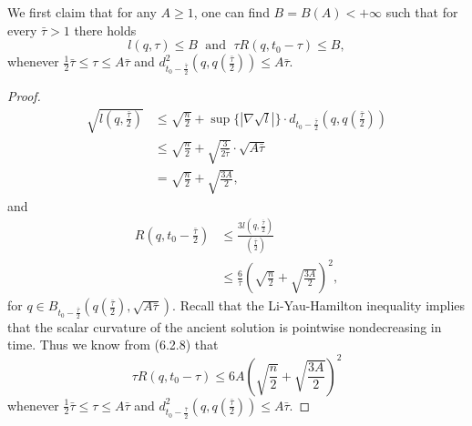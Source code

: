 \begin{lemma}
  \label{lem:cz-reduced-distance-curvature-parabolic-annulus}
We first claim that for any $A \geq 1$, one can find
$B=B(A)<+\infty$ such that for every $\bar{\tau}>1$ there holds
\begin{equation} l(q,\tau)\leq B \; \mbox{ and }\;  \tau R(q,t_0-\tau)\leq B,
\end{equation} whenever $\frac{1}{2}\bar{\tau}\leq \tau \leq A\bar{\tau}$ and
$d_{t_0-\frac{\bar{\tau}}{2}}^2 (q,q(\frac{\bar{\tau}}{2}))\leq
A\bar{\tau}.$

\end{lemma}
\begin{proof}
\begin{align}
\sqrt{l(q,\frac{\bar{\tau}}{2})} &  \leq \sqrt{\frac{n}{2}}+
\sup\{|\nabla \sqrt{l}|\}\cdot d_{t_0-\frac{\bar{\tau}}{2}}
\left(q,q\left(\frac{\bar{\tau}}{2}\right)\right) \\
&  \leq \sqrt{\frac{n}{2}}+ \sqrt{\frac{3}{2\bar{\tau}}}\cdot
\sqrt{A\bar{\tau}} \nonumber\\
&  = \sqrt{\frac{n}{2}}+\sqrt{\frac{3A}{2}},\nonumber
\end{align}  %
and
\begin{align}
R\left(q,t_0-\frac{\bar{\tau}}{2}\right)&  \leq
\frac{3l(q,\frac{\bar{\tau}}{2})}{(\frac{\bar{\tau}}{2})}\\
&  \leq
\frac{6}{\bar{\tau}}\left(\sqrt{\frac{n}{2}}+\sqrt{\frac{3A}{2}}\right)^2,\nonumber
\end{align}  %
for $q\in
B_{t_0-\frac{\bar{\tau}}{2}}(q(\frac{\bar{\tau}}{2}),\sqrt{A\bar{\tau}})$.
Recall that the Li-Yau-Hamilton inequality implies that the scalar
curvature of the ancient solution is pointwise nondecreasing in
time. Thus we know from (6.2.8) that \begin{equation} \tau R(q,t_0-\tau)\leq
6A\left(\sqrt{\frac{n}{2}}+\sqrt{\frac{3A}{2}}\right)^2 %
\end{equation} whenever $\frac{1}{2}\bar{\tau}\leq \tau \leq A\bar{\tau}$ and
$d_{t_0-\frac{\bar{\tau}}{2}}^2 (q,q(\frac{\bar{\tau}}{2}))\leq
A\bar{\tau}.$


\end{proof}
